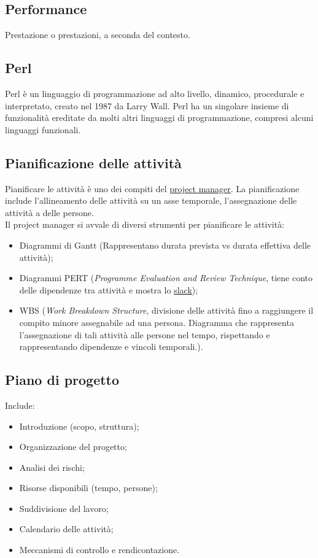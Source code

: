 	\subsection{Performance}	
	\label{sec:performance}
	Prestazione o prestazioni, a seconda del contesto.

	\subsection{Perl}
	Perl è un linguaggio di programmazione ad alto livello, dinamico, procedurale e interpretato, creato nel 1987 da Larry Wall. Perl ha un singolare insieme di funzionalità ereditate da molti altri linguaggi di programmazione, compresi alcuni linguaggi funzionali.
	
	

	\subsection{Pianificazione delle attività}	
	\label{sec:pianificazioneattivita}
	Pianificare le attività è uno dei compiti del \underline{\hyperref[sec:projectmanager]{project manager}}.
	La pianificazione include l'allineamento delle attività su un asse temporale, l'assegnazione delle attività a delle persone. \\Il project manager si avvale di diversi strumenti per pianificare le attività:  	
	\begin{itemize}  
	\item Diagrammi di Gantt (Rappresentano durata prevista vs durata effettiva delle attività);
	\item Diagrammi PERT (\emph{Programme Evaluation and Review Technique}, tiene conto delle dipendenze tra attività e mostra lo \hyperref[sec:slack]{slack});
	\item WBS (\emph{Work Breakdown Structure}, divisione delle attività fino a raggiungere il compito minore assegnabile ad una persona. Diagramma che rappresenta l'assegnazione di tali attività alle persone nel tempo, rispettando e rappresentando dipendenze e vincoli temporali.).
	\end{itemize}	

	
	\subsection{Piano di progetto}	
	\label{sec:pianoprogetto}
	Include:
	\begin{itemize}  
	\item Introduzione (scopo, struttura);
	\item Organizzazione del progetto;
	\item Analisi dei rischi;
	\item Risorse disponibili (tempo, persone);
	\item Suddivisione del lavoro;
	\item Calendario delle attività;
	\item Meccanismi di controllo e rendicontazione.
	\end{itemize}	

